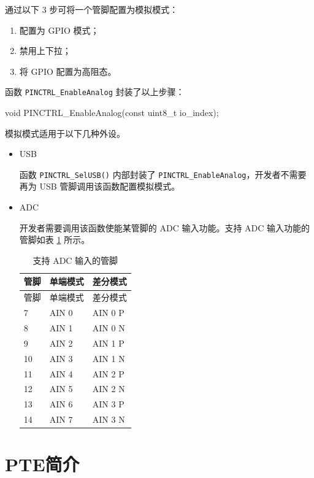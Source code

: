 \documentclass[
  12pt,
]{book}
\newenvironment{Shaded}{\begin{snugshade}}{\end{snugshade}}
\newcommand{\DataTypeTok}[1]{\textcolor[rgb]{0.13,0.29,0.53}{#1}}
\newcommand{\NormalTok}[1]{#1}
\providecommand{\tightlist}{%
  \setlength{\itemsep}{0pt}\setlength{\parskip}{0pt}}
\begin{document}
通过以下 3 步可将一个管脚配置为模拟模式：

\begin{enumerate}
\def\labelenumi{\arabic{enumi}.}
\tightlist
\item
  配置为 GPIO 模式；
\item
  禁用上下拉；
\item
  将 GPIO 配置为高阻态。
\end{enumerate}

函数 \texttt{PINCTRL\_EnableAnalog} 封装了以上步骤：

\begin{Shaded}
\begin{Highlighting}[]
\DataTypeTok{void}\NormalTok{ PINCTRL_EnableAnalog(}\DataTypeTok{const} \DataTypeTok{uint8_t}\NormalTok{ io_index);}
\end{Highlighting}
\end{Shaded}

模拟模式适用于以下几种外设。

\begin{itemize}
\item
  USB

  函数 \texttt{PINCTRL\_SelUSB()} 内部封装了 \texttt{PINCTRL\_EnableAnalog}，开发者不需要再为
  USB 管脚调用该函数配置模拟模式。
\item
  ADC

  开发者需要调用该函数使能某管脚的 ADC 输入功能。支持 ADC 输入功能的管脚如表 \ref{tab:ch-pinctrl-adc} 所示。

  \begin{longtable}[]{@{}lll@{}}
  \caption{\label{tab:ch-pinctrl-adc} 支持 ADC 输入的管脚}\tabularnewline
  \toprule
  管脚 & 单端模式 & 差分模式\tabularnewline
  \midrule
  \endfirsthead
  \toprule
  管脚 & 单端模式 & 差分模式\tabularnewline
  \midrule
  \endhead
  7 & AIN 0 & AIN 0 P\tabularnewline
  8 & AIN 1 & AIN 0 N\tabularnewline
  9 & AIN 2 & AIN 1 P\tabularnewline
  10 & AIN 3 & AIN 1 N\tabularnewline
  11 & AIN 4 & AIN 2 P\tabularnewline
  12 & AIN 5 & AIN 2 N\tabularnewline
  13 & AIN 6 & AIN 3 P\tabularnewline
  14 & AIN 7 & AIN 3 N\tabularnewline
  \bottomrule
  \end{longtable}
\end{itemize}

\hypertarget{pteux7b80ux4ecb}{%
\chapter{PTE简介}\label{pteux7b80ux4ecb}}
\end{document}

